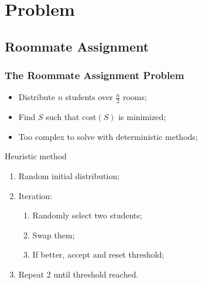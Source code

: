 \section{Problem}
\label{sec:problem}

\subsection{Roommate Assignment}
\begin{frame}
	\frametitle{The Roommate Assignment Problem}
	\begin{itemize}
		\item{Distribute $n$ students over $\frac{n}{2}$ rooms;}
		\vfill
		\item{Find $S$ such that $\mathrm{cost}(S)$ is minimized;}
		\vfill
		\item{Too complex to solve with deterministic methods;}
	\end{itemize}
\pause
	\begin{block}{Heuristic method}
		\begin{enumerate}
			\item{Random initial distribution;}
			\item{Iteration:
			\begin{enumerate}
				\item{Randomly select two students;}
				\item{Swap them;}
				\item{If better, accept and reset threshold;}
			\end{enumerate}
			}
			\item{Repeat 2 until threshold reached.}
		\end{enumerate}
	\end{block}
\end{frame}


